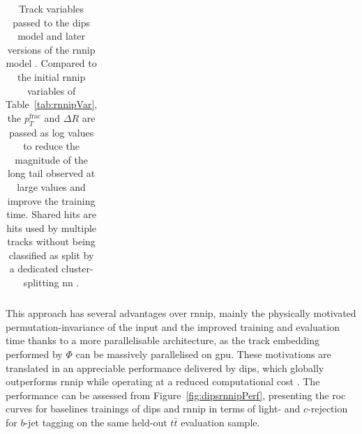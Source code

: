 \begin{table}[h]
\begin{center}
\begin{tabular}{C{3cm}|C{13cm}}
      \end{tabular}
      \caption{Track variables passed to the \gls{dips} model and later versions of the \gls{rnnip} model \cite{ATL-PHYS-PUB-2020-014}. Compared to the initial \gls{rnnip} variables of Table~\ref{tab:rnnipVar}, the $p_T^{\textrm{frac}}$ and $\Delta R$ are passed as log values to reduce the magnitude of the long tail observed at large values and improve the training time. Shared hits are hits used by multiple tracks without being classified as split by a dedicated cluster-splitting \gls{nn} \cite{ATLAS-tracks-algo}.}
    \label{tab:dipsVar}
  \end{center}
\end{table}

This approach has several advantages over \gls{rnnip}, mainly the physically motivated permutation-invariance of the input and the improved training and evaluation time thanks to a more parallelisable architecture, as the track embedding performed by $\Phi$ can be massively parallelised on \gls{gpu}. These motivations are translated in an appreciable performance delivered by \gls{dips}, which globally outperforms \gls{rnnip} while operating at a reduced computational cost \cite{ATL-PHYS-PUB-2020-014}. The performance can be assessed from Figure~\ref{fig:dipsrnnipPerf}, presenting the \gls{roc} curves for baselines trainings of \gls{dips} and \gls{rnnip} in terms of light- and $c$-rejection for $b$-jet tagging on the same held-out $t\bar{t}$ evaluation sample.

